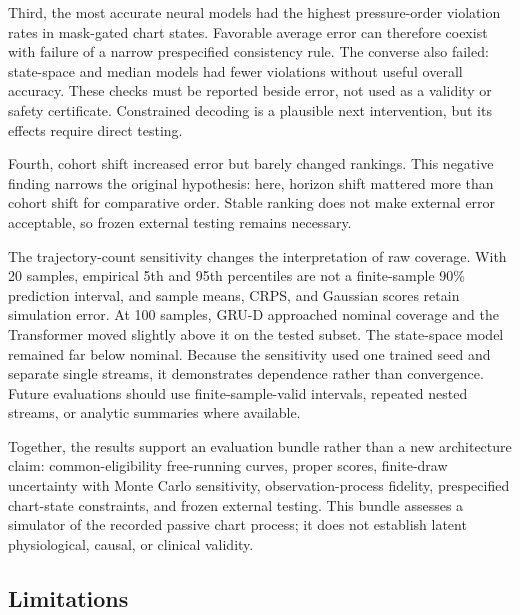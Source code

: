 \documentclass[conference]{IEEEtran}
\begin{document}
Third, the most accurate neural models had the highest pressure-order
violation rates in mask-gated chart states. Favorable average error can
therefore coexist with failure of a narrow prespecified consistency rule. The
converse also failed: state-space and median models had fewer violations
without useful overall accuracy. These checks must be reported beside error,
not used as a validity or safety certificate. Constrained decoding is a
plausible next intervention, but its effects require direct testing.

Fourth, cohort shift increased error but barely changed rankings. This negative
finding narrows the original hypothesis: here, horizon shift mattered more
than cohort shift for comparative order. Stable ranking does not make external
error acceptable, so frozen external testing remains necessary.

The trajectory-count sensitivity changes the interpretation of raw coverage.
With 20 samples, empirical 5th and 95th percentiles are not a finite-sample
90\% prediction interval, and sample means, CRPS, and Gaussian scores retain
simulation error. At 100 samples, GRU-D approached nominal coverage and the
Transformer moved slightly above it on the tested subset. The state-space
model remained far below nominal. Because the sensitivity used one trained
seed and separate single streams, it demonstrates dependence rather than
convergence. Future evaluations should use finite-sample-valid intervals,
repeated nested streams, or analytic summaries where available.

Together, the results support an evaluation bundle rather than a new
architecture claim: common-eligibility free-running curves, proper scores,
finite-draw uncertainty with Monte Carlo sensitivity, observation-process
fidelity, prespecified chart-state constraints, and frozen external testing.
This bundle assesses a simulator of the recorded passive chart process; it
does not establish latent physiological, causal, or clinical validity.

\subsection{Limitations}\label{limitations}
\end{document}
